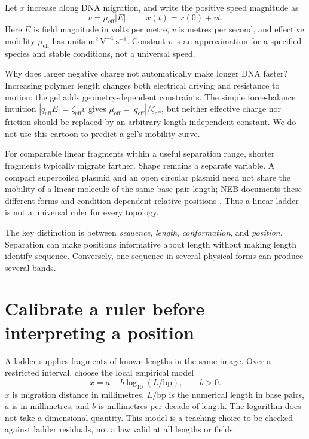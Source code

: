 Let $x$ increase along DNA migration, and write the positive speed magnitude as
\begin{equation}
v=\mu_{\mathrm{eff}}|E|,\qquad x(t)=x(0)+v t.
\end{equation}
Here $E$ is field magnitude in volts per metre, $v$ is metres per second, and effective mobility $\mu_{\mathrm{eff}}$ has units $\mathrm{m^2\,V^{-1}\,s^{-1}}$. Constant $v$ is an approximation for a specified species and stable conditions, not a universal speed.

Why does larger negative charge not automatically make longer DNA faster? Increasing polymer length changes both electrical driving and resistance to motion; the gel adds geometry-dependent constraints. The simple force-balance intuition $|q_{\mathrm{eff}}E|=\zeta_{\mathrm{eff}}v$ gives $\mu_{\mathrm{eff}}=|q_{\mathrm{eff}}|/\zeta_{\mathrm{eff}}$, but neither effective charge nor friction should be replaced by an arbitrary length-independent constant. We do not use this cartoon to predict a gel's mobility curve.

For comparable linear fragments within a useful separation range, shorter fragments typically migrate farther. Shape remains a separate variable. A compact supercoiled plasmid and an open circular plasmid need not share the mobility of a linear molecule of the same base-pair length; NEB documents these different forms and condition-dependent relative positions \cite{neb}. Thus a linear ladder is not a universal ruler for every topology.

The key distinction is between \emph{sequence}, \emph{length}, \emph{conformation}, and \emph{position}. Separation can make positions informative about length without making length identify sequence. Conversely, one sequence in several physical forms can produce several bands.

\section{Calibrate a ruler before interpreting a position}
A ladder supplies fragments of known lengths in the same image. Over a restricted interval, choose the local empirical model
\begin{equation}
x=a-b\log_{10}(L/\mathrm{bp}),\qquad b>0. \label{eq:ladder}
\end{equation}
$x$ is migration distance in millimetres, $L/\mathrm{bp}$ is the numerical length in base pairs, $a$ is in millimetres, and $b$ is millimetres per decade of length. The logarithm does not take a dimensional quantity. This model is a teaching choice to be checked against ladder residuals, not a law valid at all lengths or fields.

